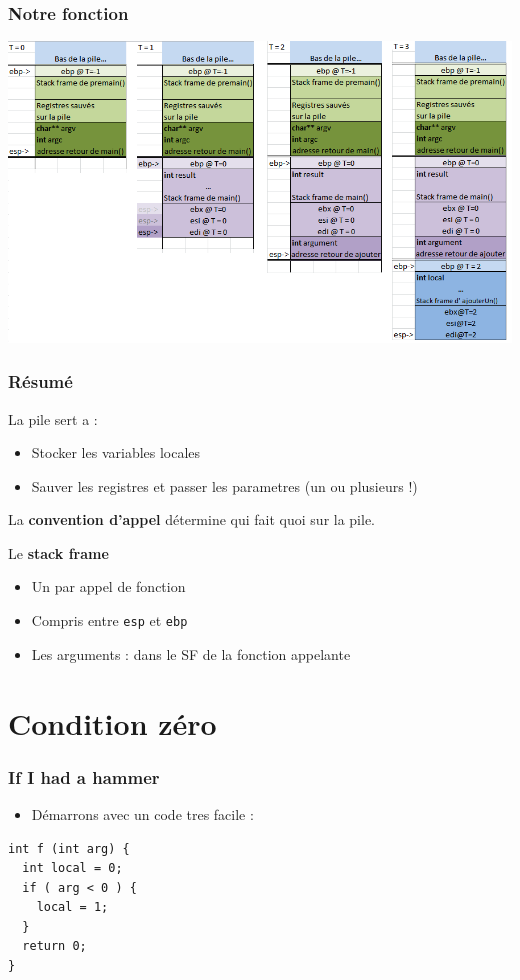 \documentclass{beamer}
\begin{document}
\begin{frame}[fragile]
\frametitle{Notre fonction}

\includegraphics[scale=0.45]{stack.png}
\end{frame}

\begin{frame}[fragile]
\frametitle{Résumé}
La pile sert a :
\begin{itemize}
\item Stocker les variables locales
\item Sauver les registres et passer les parametres (un ou plusieurs !)
\end{itemize}
La \textbf{convention d'appel} détermine qui fait quoi sur la pile.

Le \textbf{stack frame}
\begin{itemize}
\item Un par appel de fonction
\item Compris entre \texttt{esp} et \texttt{ebp}
\item Les arguments : dans le SF de la fonction appelante
\end{itemize}

\end{frame}

\section{Condition zéro}
\begin{frame}[fragile]
\frametitle{If I had a hammer}
\begin{itemize}
\item Démarrons avec un code tres facile :
\end{itemize}
\begin{lstlisting}
int f (int arg) {
  int local = 0;
  if ( arg < 0 ) {
    local = 1;
  }
  return 0;
}
\end{lstlisting}
\end{frame}
\end{document}
